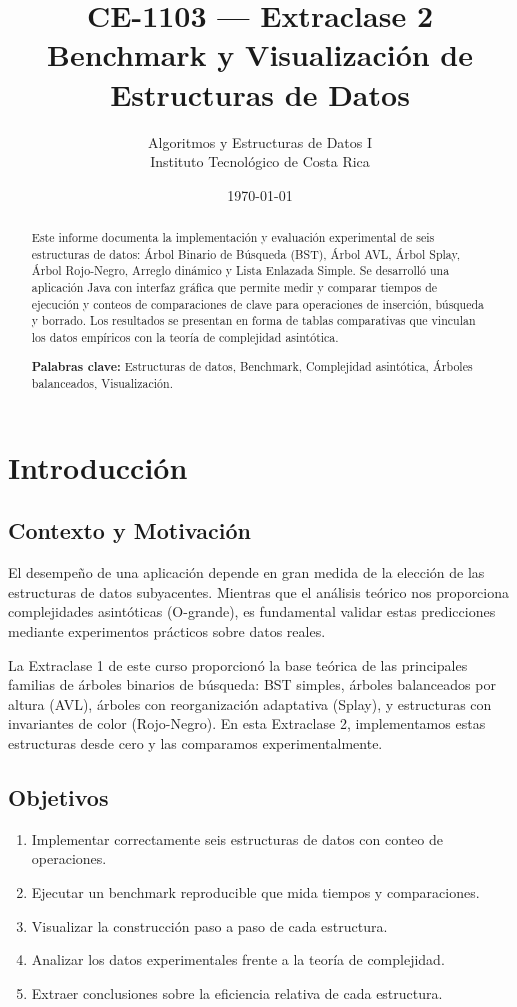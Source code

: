 \documentclass[12pt,a4paper]{article}
\title{\textbf{CE-1103 — Extraclase 2} \\
Benchmark y Visualización de Estructuras de Datos}
\author{Algoritmos y Estructuras de Datos I \\
Instituto Tecnológico de Costa Rica}
\date{\today}
\begin{document}
\maketitle

\begin{abstract}
Este informe documenta la implementación y evaluación experimental de seis estructuras de datos: Árbol Binario de Búsqueda (BST), Árbol AVL, Árbol Splay, Árbol Rojo-Negro, Arreglo dinámico y Lista Enlazada Simple. Se desarrolló una aplicación Java con interfaz gráfica que permite medir y comparar tiempos de ejecución y conteos de comparaciones de clave para operaciones de inserción, búsqueda y borrado. Los resultados se presentan en forma de tablas comparativas que vinculan los datos empíricos con la teoría de complejidad asintótica.

\noindent \textbf{Palabras clave:} Estructuras de datos, Benchmark, Complejidad asintótica, Árboles balanceados, Visualización.
\end{abstract}

\section{Introducción}

\subsection{Contexto y Motivación}

El desempeño de una aplicación depende en gran medida de la elección de las estructuras de datos subyacentes. Mientras que el análisis teórico nos proporciona complejidades asintóticas (O-grande), es fundamental validar estas predicciones mediante experimentos prácticos sobre datos reales.

La Extraclase 1 de este curso proporcionó la base teórica de las principales familias de árboles binarios de búsqueda: BST simples, árboles balanceados por altura (AVL), árboles con reorganización adaptativa (Splay), y estructuras con invariantes de color (Rojo-Negro). En esta Extraclase 2, implementamos estas estructuras desde cero y las comparamos experimentalmente.

\subsection{Objetivos}

\begin{enumerate}
    \item Implementar correctamente seis estructuras de datos con conteo de operaciones.
    \item Ejecutar un benchmark reproducible que mida tiempos y comparaciones.
    \item Visualizar la construcción paso a paso de cada estructura.
    \item Analizar los datos experimentales frente a la teoría de complejidad.
    \item Extraer conclusiones sobre la eficiencia relativa de cada estructura.
\end{enumerate}
\end{document}
